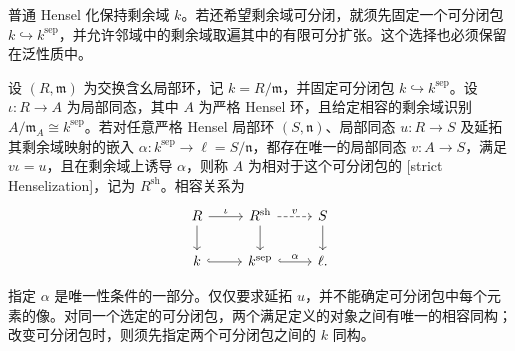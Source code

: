 普通 Hensel 化保持剩余域 \(k\)。若还希望剩余域可分闭，就须先固定一个可分闭包 \(k\hookrightarrow k^{\mathrm{sep}}\)，并允许邻域中的剩余域取遍其中的有限可分扩张。这个选择也必须保留在泛性质中。

\begin{definition}\label{b3:def:strict-henselization}
	设 \((R,\mathfrak m)\) 为交换含幺局部环，记 \(k=R/\mathfrak m\)，并固定可分闭包 \(k\hookrightarrow k^{\mathrm{sep}}\)。设 \(\iota:R\to A\) 为局部同态，其中 \(A\) 为严格 Hensel 环，且给定相容的剩余域识别 \(A/\mathfrak m_A\cong k^{\mathrm{sep}}\)。若对任意严格 Hensel 局部环 \((S,\mathfrak n)\)、局部同态 \(u:R\to S\) 及延拓其剩余域映射的嵌入 \(\alpha:k^{\mathrm{sep}}\to\ell=S/\mathfrak n\)，都存在唯一的局部同态 \(v:A\to S\)，满足 \(v\iota=u\)，且在剩余域上诱导 \(\alpha\)，则称 \(A\) 为相对于这个可分闭包的 [strict Henselization]，记为 \(R^{\mathrm{sh}}\)。相容关系为
	\[
		\begin{tikzcd}
			R \arrow[r,"\iota"] \arrow[d] & R^{\mathrm{sh}} \arrow[r,dashed,"v"] \arrow[d] & S \arrow[d] \\
			k \arrow[r,hook] & k^{\mathrm{sep}} \arrow[r,hook,"\alpha"] & \ell .
		\end{tikzcd}
	\]
\end{definition}

指定 \(\alpha\) 是唯一性条件的一部分。仅仅要求延拓 \(u\)，并不能确定可分闭包中每个元素的像。对同一个选定的可分闭包，两个满足定义的对象之间有唯一的相容同构；改变可分闭包时，则须先指定两个可分闭包之间的 \(k\) 同构。

